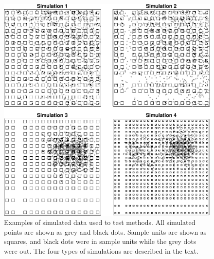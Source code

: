 \documentclass[12pt, titlepage]{article}\usepackage[]{graphicx}\usepackage[]{color}
\begin{document}
	\begin{figure}[H]
	\begin{center}
	\includegraphics[width=450pt]{SimAll4Types}
	\end{center}
	\caption{Examples of simulated data used to test methods.  All simulated points are shown as grey and black dots.  Sample units are shown as squares, and black dots were in sample units while the grey dots were out. The four types of simulations are described in the text.\label{fig:SimulationPlots}}
	\end{figure}


\end{document}
